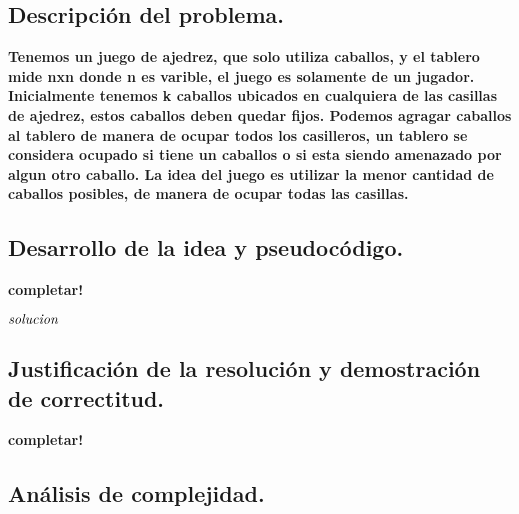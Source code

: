 \subsection{Descripción del problema.}

\vspace*{0.3cm}

\textbf{Tenemos un juego de ajedrez, que solo utiliza caballos, y el tablero mide nxn donde n es varible, el juego es solamente de un jugador.
Inicialmente tenemos k caballos ubicados en cualquiera de las casillas de ajedrez, estos caballos deben quedar fijos.
Podemos agragar caballos al tablero de manera de ocupar todos los casilleros, un tablero se considera ocupado
si tiene un caballos o si esta siendo  amenazado por algun otro caballo.
La idea del juego es utilizar la menor cantidad de caballos posibles, de manera de ocupar todas las casillas.
}





\newpage
\subsection{Desarrollo de la idea y pseudocódigo.}

\vspace*{0.3cm}

\textbf{completar!}

\begin{codebox}
\li \Return $\id{solucion}$
\end{codebox}



\newpage
\subsection{Justificación de la resolución y demostración de correctitud.}

\vspace*{0.3cm}

\textbf{completar!}



\newpage
\subsection{Análisis de complejidad.}

